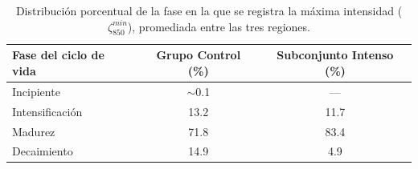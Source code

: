 \begin{table}[ht]
\centering
\caption{Distribución porcentual de la fase en la que se registra la máxima intensidad ($\zeta_{850}^{min}$), promediada entre las tres regiones.}
\label{tab:fase_max_intensidad}
\begin{tabular*}{\textwidth}{@{\extracolsep{\fill}}lcc}
\hline
Fase del ciclo de vida & Grupo Control (\%) & Subconjunto Intenso (\%) \\ 
\hline
Incipiente       & $\sim$0.1 & ---  \\
Intensificación  & 13.2      & 11.7 \\
Madurez          & 71.8      & 83.4 \\
Decaimiento      & 14.9      & 4.9  \\ 
\hline
\end{tabular*}
\end{table}

